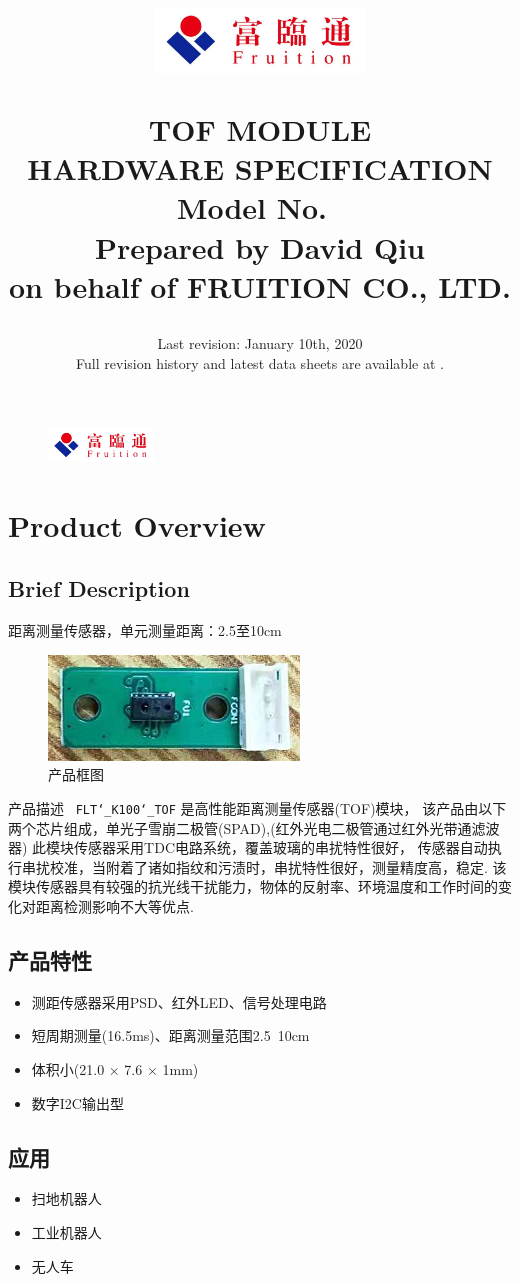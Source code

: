 \documentclass{scrreprt}
\title{
	\begin{figure}[H]
		\centering\includegraphics[width=0.5\textwidth]{logo.jpeg}
	\end{figure}
	\vspace{1cm}
	\flushright
	\Huge{TOF MODULE}\\
	\Huge{HARDWARE SPECIFICATION}\\
	\vspace{2cm}
	\huge{Model No.\ \modelno}\\
	\vspace{2cm}
	\LARGE{Prepared by David Qiu \\ on behalf of FRUITION CO., LTD.}
}
\date{
	Last revision: January 10th, 2020 \\
	Full revision history and latest data sheets are available at \upstream.
}
\newcommand{\pchapter}[1]{
	\begingroup\let\clearpage\relax
	\newpage
	\begin{figure}[H]
		\includegraphics[width=0.25\textwidth]{logo.jpeg}
	\end{figure}
	\chapter{#1}
	\endgroup
}
\newcommand{\modelno}{
	\texttt{FLT\char`_K100\char`_TOF}
}
\newcommand{\x}{
	$\times$
}
\begin{document}
\begin{CJK*}{UTF8}{gbsn}
\maketitle
\tableofcontents

\pchapter{Product Overview}
\section{Brief Description}
距离测量传感器，单元测量距离：2.5至10cm

\begin{figure}[H]
\center\includegraphics{tof-picture.png}
\caption{产品框图}
\end{figure}

产品描述\ \modelno 是高性能距离测量传感器(TOF)模块，
该产品由以下两个芯片组成，单光子雪崩二极管(SPAD),(红外光电二极管通过红外光带通滤波器)
此模块传感器采用TDC电路系统，覆盖玻璃的串扰特性很好，
传感器自动执行串扰校准，当附着了诸如指纹和污渍时，串扰特性很好，测量精度高，稳定.
该模块传感器具有较强的抗光线干扰能力，物体的反射率、环境温度和工作时间的变化对距离检测影响不大等优点.

\section{产品特性}
\begin{itemize}
	\item 测距传感器采用PSD、红外LED、信号处理电路
	\item 短周期测量(16.5ms)、距离测量范围2.5~10cm
	\item 体积小(21.0\x7.6\x1mm)
	\item 数字I2C输出型
\end{itemize}

\section{应用}
\begin{itemize}
	\item 扫地机器人
	\item 工业机器人
	\item 无人车
\end{itemize}


\end{CJK*}
\end{document}
